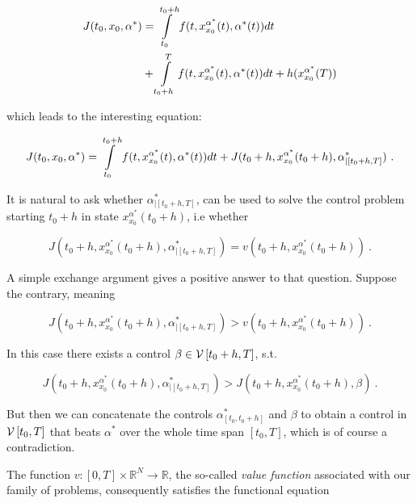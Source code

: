 	\begin{equation*}
		\begin{split}
		J(t_0, x_0, \alpha^{*})& = \pathint{\alpha^{*}}{t_0}{t_0 + h} \\
		 &+ \pathint{\alpha^{*}}{t_0 + h}{T} + h(x^{\alpha^{*}}_{x_0}(T)) 
		\end{split}
	\end{equation*}
	
	which leads to the interesting equation:
	
	\begin{equation}
		\label{subproblem}
		J(t_0, x_0, \alpha^{*}) = \pathint{\alpha^{*}}{t_0}{t_0 + h} + J(t_0 + h, x^{\alpha^{*}}_{x_0}(t_0 + h), \alpha^{*}_{|\left[t_0 + h, T\right]}) \ .
	\end{equation}
	
	It is natural to ask whether $ \alpha^{*}_{|\left[t_0 + h, T\right]} $, can be used to solve the control problem starting $ t_0 + h $ in state $ x^{\alpha^{*}}_{x_0}(t_0 + h) $, i.e whether
	
	\begin{equation*}
		J(t_0 + h, x^{\alpha^{*}}_{x_0}(t_0 + h), \alpha^{*}_{|\left[t_0 + h, T\right]}) =  v(t_0 + h, x^{\alpha^{*}}_{x_0}(t_0 + h)) \ .
	\end{equation*}
	
	A simple exchange argument gives a positive answer to that question. Suppose the contrary, meaning
	
	\begin{equation*}
		J(t_0 + h, x^{\alpha^{*}}_{x_0}(t_0 + h), \alpha^{*}_{|\left[t_0 + h, T\right]}) >  v(t_0 + h, x^{\alpha^{*}}_{x_0}(t_0 + h)) \ .
	\end{equation*}
	
	In this case there exists a control $ \beta \in \controlspace[t_0 + h]$, s.t.
	
	\begin{equation*}
		J(t_0 + h, x^{\alpha^{*}}_{x_0}(t_0 + h), \alpha^{*}_{|\left[t_0 + h, T\right]}) > J(t_0 + h, x^{\alpha^{*}}_{x_0}(t_0 + h), \beta) \ .
	\end{equation*}
	
	But then we can concatenate the controls $ \alpha^{*}_{\left[t_0, t_0 + h \right]} $ and $ \beta $ to obtain a control in $ \controlspace[t_0] $ that beats $ \alpha^{*} $ over the whole time span $ \left[t_0, T \right] $, which is of course a contradiction.
	
	The function $ v : \left[ 0, T \right] \times \mathbb{R}^N \to  \mathbb{R}$, the so-called \emph{value function} associated with our family of problems, consequently satisfies the functional equation
	
